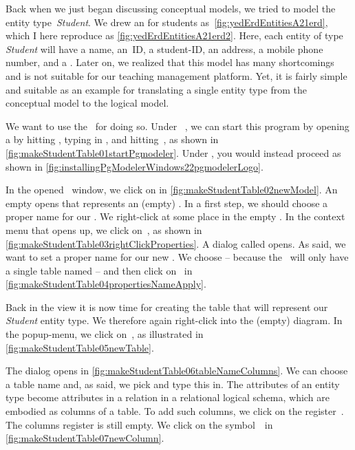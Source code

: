 %
%
Back when we just began discussing conceptual models, we tried to model the entity type~\emph{Student}.
We drew an  for students as~\cref{fig:yedErdEntitiesA21erd}, which I here reproduce as \cref{fig:yedErdEntitiesA21erd2}.
Here, each entity of type \emph{Student} will have a name, an~ID, a student\nobreakdashes-ID, an address, a mobile phone number, and a .
Later on, we realized that this model has many shortcomings and is not suitable for our teaching management platform.
Yet, it is fairly simple and suitable as an example for translating a single entity type from the conceptual model to the logical model.

We want to use the \pgmodeler\ for doing so.
Under \ubuntu\ \linux, we can start this program by opening a  by hitting \ubuntuTerminal, typing in , and hitting~\keys{\enter}, as shown in \cref{fig:makeStudentTable01startPgmodeler}.
Under \microsoftWindows, you would instead proceed as shown in \cref{fig:installingPgModelerWindows22pgmodelerLogo}.

In the opened \pgmodeler\ window, we click on  in \cref{fig:makeStudentTable02newModel}.
An empty  opens that represents an (empty) \db.
In a first step, we should choose a proper name for our \db.
We right-click at some place in the empty .
In the context menu that opens up, we click on~, as shown in \cref{fig:makeStudentTable03rightClickProperties}.
A dialog called  opens.
As said, we want to set a proper name for our new \db.
We choose  -- because the \db\ will only have a single table named  -- and then click on~ in \cref{fig:makeStudentTable04propertiesNameApply}.

Back in the  view it is now time for creating the table that will represent our \emph{Student} entity type.
We therefore again right-click into the (empty) diagram.
In the popup-menu, we click on~, as illustrated in \cref{fig:makeStudentTable05newTable}.

The  dialog opens in \cref{fig:makeStudentTable06tableNameColumns}.
We can choose a table name and, as said, we pick  and type this in.
The attributes of an entity type become attributes in a relation in a relational logical schema, which are embodied as columns of a table.
To add such columns, we click on the register~.
The columns register is still empty.
We click on the  symbol~\pgmodelerAddItem\ in \cref{fig:makeStudentTable07newColumn}.

